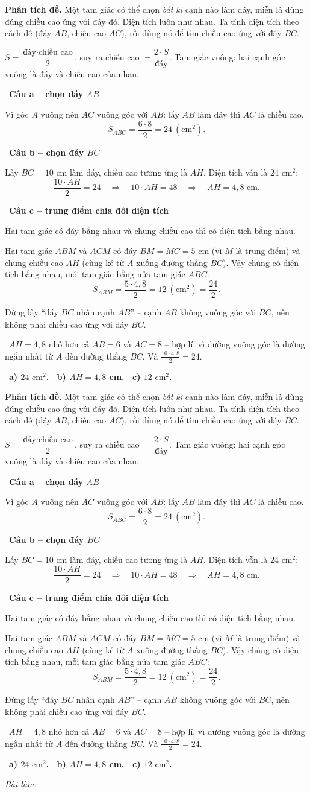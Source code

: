 \documentclass[11pt]{article}
\newif\ifsol \soltrue
\providecommand{\AnsWord}{Đáp số}
\newcommand{\ans}[1]{\par\smallskip{\bfseries\color{tmGreen!88!black}\AnsWord:}\ {\bfseries\color{AnsRed}#1}\par}
\newcommand{\probsol}[1]{%
  \begin{lrbox}{\solmeasure}\begin{minipage}{\dimexpr\linewidth-24pt\relax}#1\end{minipage}\end{lrbox}%
  \ifsol
    \begin{solbox}#1\end{solbox}%
  \else
    \setlength{\solht}{\dimexpr\ht\solmeasure+\dp\solmeasure+0.85cm\relax}%
    \ifdim\solht<1.35cm\setlength{\solht}{1.35cm}\fi
    \ifdim\solht>\StudentMaxWork\setlength{\solht}{\StudentMaxWork}\fi
    \begin{tcolorbox}[colback=white,colframe=Line,boxrule=0.8pt,arc=5pt,
      left=8pt,right=8pt,top=4pt,bottom=4pt,height=\solht]{\footnotesize\color{Slate}\itshape\WorkWord}\end{tcolorbox}%
  \fi}
\newlength{\StudentMaxWork}\setlength{\StudentMaxWork}{7.5cm}
\newcommand{\step}[2]{\par\smallskip\noindent{\bfseries\color{tmBlue!85!black}\StepWord~#1.}\ {\bfseries #2}\par\nopagebreak}
\newcommand{\verify}[1]{\par\smallskip\noindent{\bfseries\color{tmGreen!80!black}\faCheckCircle\ \CheckWord}\ #1\par}
\def\WorkWord{Bài làm:}
\def\AnsWord{Đáp số}
\def\StepWord{Bước}
\def\CheckWord{Thử lại:}
\begin{document}
\probsol{
\textbf{Phân tích đề.} Một tam giác có thể chọn \emph{bất kì} cạnh nào làm đáy, miễn là dùng đúng chiều cao ứng với đáy đó. Diện tích luôn như nhau. Ta tính diện tích theo cách dễ (đáy $AB$, chiều cao $AC$), rồi dùng nó để tìm chiều cao ứng với đáy $BC$.
\begin{recallbox}$S=\dfrac{\text{đáy}\cdot\text{chiều cao}}{2}$, suy ra chiều cao $=\dfrac{2\cdot S}{\text{đáy}}$. Tam giác vuông: hai cạnh góc vuông là đáy và chiều cao của nhau.\end{recallbox}
\step{1}{Câu a -- chọn đáy $AB$}
Vì góc $A$ vuông nên $AC$ vuông góc với $AB$: lấy $AB$ làm đáy thì $AC$ là chiều cao.
\[ S_{ABC}=\frac{6\cdot8}{2}=24\ (\text{cm}^2). \]

\step{2}{Câu b -- chọn đáy $BC$}
Lấy $BC=10$ cm làm đáy, chiều cao tương ứng là $AH$. Diện tích vẫn là $24\text{ cm}^2$:
\[ \frac{10\cdot AH}{2}=24\quad\Rightarrow\quad 10\cdot AH=48\quad\Rightarrow\quad AH=4{,}8\text{ cm}. \]

\step{3}{Câu c -- trung điểm chia đôi diện tích}
\begin{recallbox}Hai tam giác có đáy bằng nhau và chung chiều cao thì có diện tích bằng nhau.\end{recallbox}
Hai tam giác $ABM$ và $ACM$ có đáy $BM=MC=5$ cm (vì $M$ là trung điểm) và chung chiều cao $AH$ (cùng kẻ từ $A$ xuống đường thẳng $BC$). Vậy chúng có diện tích bằng nhau, mỗi tam giác bằng nửa tam giác $ABC$:
\[ S_{ABM}=\frac{5\cdot4{,}8}{2}=12\ (\text{cm}^2)=\frac{24}{2}. \]
\begin{warnbox}Đừng lấy ``đáy $BC$ nhân cạnh $AB$'' -- cạnh $AB$ không vuông góc với $BC$, nên không phải chiều cao ứng với đáy $BC$.\end{warnbox}
\verify{$AH=4{,}8$ nhỏ hơn cả $AB=6$ và $AC=8$ -- hợp lí, vì đường vuông góc là đường ngắn nhất từ $A$ đến đường thẳng $BC$. Và $\frac{10\cdot4{,}8}{2}=24$.}
\ans{a) $24\text{ cm}^2$. \ b) $AH=4{,}8$ cm. \ c) $12\text{ cm}^2$.}
}

\providecommand{\tbGrid}[4]{\begin{tikzpicture}[baseline=0.2cm,x=0.5cm,y=0.5cm]
  \draw[Ink,line width=0.7pt] (0,0) grid[step=1] (2,2);
  \node[font=\sffamily\bfseries,text=tmBlue!80!black,inner sep=0pt,#4] at (#1,#2) {#3};\end{tikzpicture}}
\providecommand{\tbG}[6]{\draw[Ink,line width=0.7pt] (#1,#2) grid[step=0.5] ++(1,1);
  \node[font=\sffamily\bfseries,text=tmBlue!80!black,inner sep=0pt,#6] at ({#1+#3},{#2+#4}) {#5};}
\end{document}
